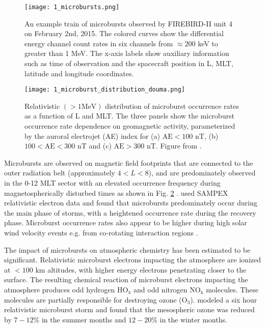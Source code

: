 \begin{figure}
\texttt{[image: 1\_microbursts.png]}
\caption{An example train of microbursts observed by FIREBIRD-II unit 4 on February 2nd, 2015. The colored curves show the differential energy channel count rates in six channels from $\approx 200$ keV to greater than 1 MeV. The x-axis labels show auxiliary information such as time of observation and the spacecraft position in L, MLT, latitude and longitude coordinates.}
\label{Intro:microbursts}
\end{figure}

\begin{figure}
\texttt{[image: 1\_microburst\_distribution\_douma.png]}
\caption{Relativistic $(> 1 \mathrm{MeV})$ distribution of microburst occurrence rates as a function of L and MLT. The three panels show the microburst occurrence rate dependence on geomagnetic activity, parameterized by the auroral electrojet (AE) index for (a) $\mathrm{AE} < 100$ nT, (b) $100 < \mathrm{AE} < 300$ nT and (c) $\mathrm{AE} > 300$ nT. Figure from \citet{Douma2017}.}
\label{Intro:microburst_distribution}
\end{figure}

Microbursts are observed on magnetic field footprints that are connected to the outer radiation belt (approximately $4 < L < 8$), and are predominately observed in the 0-12 MLT sector with an elevated occurrence frequency during magnetospherically disturbed times as shown in Fig. \ref{Intro:microburst_distribution} \citep[e.g.][]{Douma2017}. \citet{O'Brien2003} used SAMPEX relativistic electron data and found that microbursts predominately occur during the main phase of storms, with a heightened occurrence rate during the recovery phase. Microburst occurrence rates also appear to be higher during high solar wind velocity events e.g. from co-rotating interaction regions \citep{O'Brien2003, Greeley2019}.

The impact of microbursts on atmospheric chemistry has been estimated to be significant. Relativistic microburst electrons impacting the atmosphere are ionized at $<100$ km altitudes, with higher energy electrons penetrating closer to the surface. The resulting chemical reaction of microburst electrons impacting the atmosphere produces odd hydrogen $\mathrm{HO_x}$ and odd nitrogen $\mathrm{NO_x}$ molecules. These molecules are partially responsible for destroying ozone ($\mathrm{O_3}$). \citet{Seppala2018} modeled a six hour relativistic microburst storm and found that the mesospheric ozone was reduced by $7-12 \%$ in the summer months and $12-20 \%$ in the winter months. 

